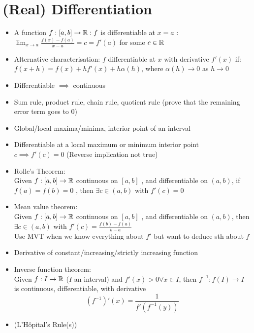 \section{(Real) Differentiation}
\begin{itemize}
      \item A function $f: [a,b] \to \mathbb{R}: f $ is differentiable at $x = a$ :\\
            $\lim_{x\to a} \frac{f(x)-f(a)}{x-a} = c = f'(a)$ for some $c \in \mathbb{R}$
      \item Alternative characterisation: $f$ differentiable at $x$ with derivative $f'(x)$ if:
            $ f(x+h) = f(x) + hf'(x) + h\alpha(h)$, where $\alpha(h) \to 0$ as $h \to 0$
      \item Differentiable $\implies$ continuous
      \item Sum rule, product rule, chain rule, quotient rule (prove that the remaining error term goes to $0$)
      \item Global/local maxima/minima, interior point of an interval
      \item Differentiable at a local maximum or minimum interior point $c \implies f'(c) = 0 $ (Reverse implication not true)
      \item Rolle's Theorem:  \\
            Given $ f: [a,b] \to \mathbb{R} $ continuous on $[a,b]$ , and differentiable on $ (a,b) $, if $f(a) = f(b) = 0$ , then  $\exists c \in (a,b)$  with $ f'(c) = 0$

      \item Mean value theorem: \\
            Given $ f: [a,b] \to \mathbb{R} $ continuous on $[a,b]$ , and differentiable on $ (a,b) $, then $\exists c \in (a,b)$ with $f'(c) = \frac{f(b)-f(a)}{b-a}$ \\

            Use MVT when we know everything about $f'$ but want to deduce sth about $f$

      \item Derivative of constant/increasing/strictly increasing function
      \item Inverse function theorem: \\
            Given $f : I \to \mathbb{R}$ ($I$ an interval) and $f'(x) >0 \forall x \in I$, then $f^{-1} : f(I) \to I$ is continuous, differentiable, with derivative \[ (f^{-1})' (x) = \frac{1}{f'(f^{-1}(y))}\]
      \item (L'H\^opital's Rule(s))

\end{itemize}

